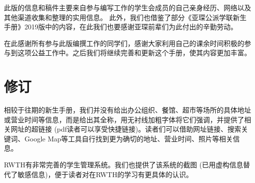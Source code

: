   此版的信息和稿件主要来自参与编写工作的学生会成员的自己亲身经历、网络以及其他渠道收集和整理的实用信息。 此外，我们也借鉴了部分《亚琛公派学联新生手册》2019版中的内容，在此我们也要感谢亚琛前辈们为此付出的辛勤劳动。

  在此感谢所有参与此版编撰工作的同学们，感谢大家利用自己的课余时间积极的参与到这项公益工作中。之后我们将继续完善和更新这个手册，使其内容更加丰富。



  \newpage

\chapter*{修订}


  相较于往期的新生手册，我们并没有给出办公组织、餐馆、超市等场所的具体地址或营业时间等信息，而是给出其全称，用无衬线加粗字体将它们强调，并提供了相关网址的超链接 (pdf读者可以享受快捷链接)。读者们可以借助网址链接、搜索关键词、Google Map等工具自行找到更为确切的地址、营业时间、照片等相关信息。

  RWTH有非常完善的学生管理系统。我们也提供了该系统的截图 (已用虚构信息替代了敏感信息)，便于读者对在RWTH的学习有更具体的认识。
